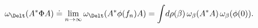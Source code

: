 \begin{equation} \label{convergence}
\omega_\Delt (A^* \Phi A) \doteq \lim_{n \rightarrow \infty}
\omega_\Delt (A^* \phi(f_n) A) =
\int \! d\rho(\beta) \, \omega_\beta(A^* A) \, \omega_\beta(\phi(0)).
\end{equation}

